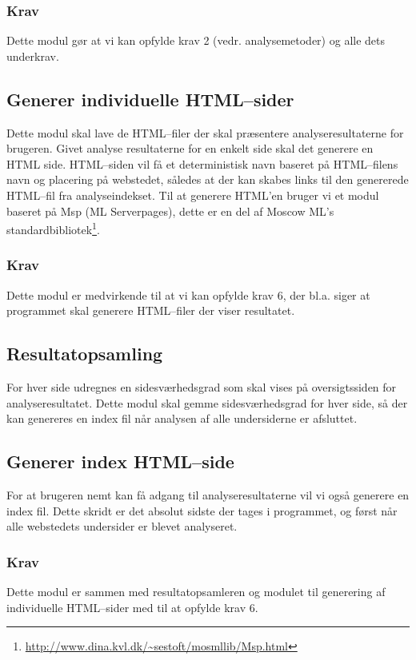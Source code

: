 \documentclass[a4paper,oneside]{memoir}
\begin{document}
\subsubsection*{Krav}
Dette modul gør at vi kan opfylde krav 2 (vedr. analysemetoder) og
alle dets underkrav.

\subsection{Generer individuelle HTML--sider}
Dette modul skal lave de HTML--filer der skal præsentere
analyseresultaterne for brugeren. Givet analyse resultaterne for en
enkelt side skal det generere en HTML side. HTML--siden vil få et
deterministisk navn baseret på HTML--filens navn og placering på
webstedet, således at der kan skabes links til den genererede HTML--fil
fra analyseindekset. Til at generere HTML'en bruger vi et modul
baseret på Msp (ML Serverpages), dette er en del af Moscow ML's
standardbibliotek\footnote{\url{http://www.dina.kvl.dk/~sestoft/mosmllib/Msp.html}}.

\subsubsection*{Krav}
Dette modul er medvirkende til at vi kan opfylde krav 6, der
bl.a. siger at programmet skal generere HTML--filer der viser
resultatet.

\subsection{Resultatopsamling}
For hver side udregnes en sidesværhedsgrad som skal vises på
oversigtssiden for analyseresultatet. Dette modul skal gemme
sidesværhedsgrad for hver side, så der kan genereres en index fil når
analysen af alle undersiderne er afsluttet.

\subsection{Generer index HTML--side}
For at brugeren nemt kan få adgang til analyseresultaterne vil vi også
generere en index fil. Dette skridt er det absolut sidste der tages i
programmet, og først når alle webstedets undersider er blevet
analyseret.

\subsubsection*{Krav}
Dette modul er sammen med resultatopsamleren og modulet til generering
af individuelle HTML--sider med til at opfylde krav 6.
\end{document}
